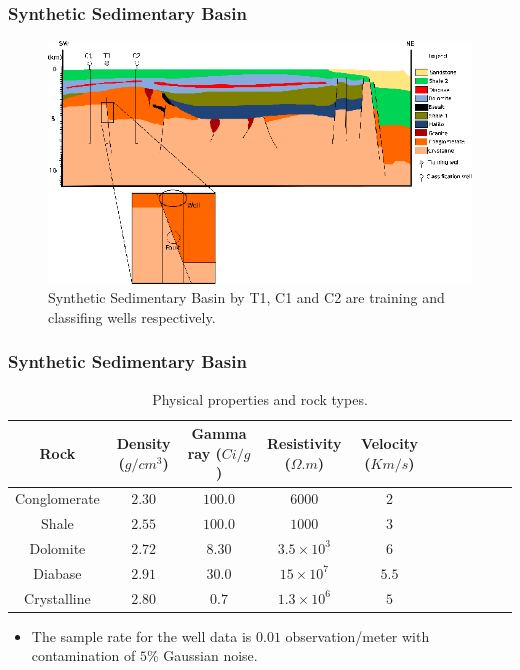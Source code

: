 \documentclass[aspectratio=10]{beamer} %
\begin{document}
\begin{frame}
	\frametitle{Synthetic Sedimentary Basin}
	\begin{figure}[H]
		\centering
		\includegraphics[scale=0.34]{Imagens/Basin.eps}
		\caption{Synthetic Sedimentary Basin by \cite{Sal2008}  T1, C1 and C2 are training and classifing wells respectively.}
		\label{Model}
	\end{figure}
\end{frame}


\begin{frame}
\frametitle{Synthetic Sedimentary Basin}
\begin{table}[H]\tiny
	\caption{Physical properties and rock types.}
\begin{tabular}{@{}ccccccccccc@{}}
	\toprule
	Rock & Density ($g/cm^{3}$) & Gamma ray ($Ci/g$) & Resistivity ($\Omega.m$)& Velocity ($Km/s$) &\\ \midrule
	Conglomerate &     $2.30$ 		  &       $100.0$       &           $6000$           &			$2$   		   	&\\
	Shale	 &       $2.55$           &       $100.0$       &           $1000$           &     		$3$		 &\\
	Dolomite     &       $2.72$           &       $8.30$        &           $3.5 \times 10^{3}$           &  	$6$    			 &\\
	Diabase    &       $2.91$           &       $30.0$        &           $15 \times 10^{7}$           &      $5.5$				 &\\
	Crystalline  &       $2.80$           &       $0.7$         &           $1.3 \times 10^{6}$           & 		$5$		     &\\ \bottomrule
\end{tabular}

\label{Tab1}
\end{table}

\begin{itemize}\footnotesize
	\item  The sample rate for the well data is $0.01$ observation/meter with contamination of $5$\% Gaussian noise.
\end{itemize}
\end{frame}
\end{document}
